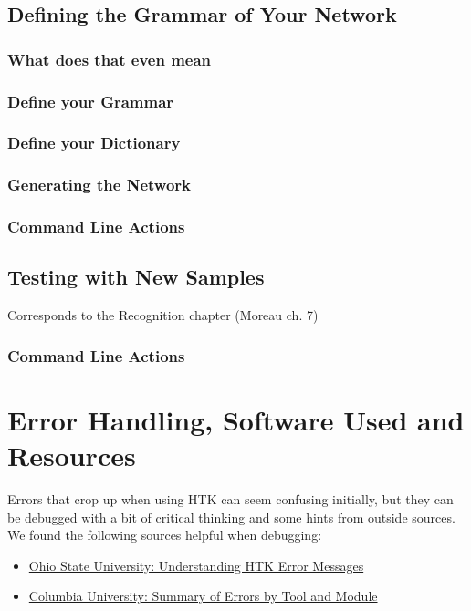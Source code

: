 \documentclass{wileySev}
\begin{document}
\chapter{Defining the Grammar of Your Network}
\section{What does that even mean}
\section{Define your Grammar}
\section{Define your Dictionary}
\section{Generating the Network}
\section{Command Line Actions}

\chapter{Testing with New Samples}
Corresponds to the Recognition chapter (Moreau ch. 7)
\section{Command Line Actions}

\part{Error Handling, Software Used and Resources}

Errors that crop up when using HTK can seem confusing initially, but they can be debugged with a bit of critical thinking and some hints from outside sources. We found the following sources helpful when debugging:
\begin{itemize}
\item \href{http://www.ling.ohio-state.edu/~bromberg/htk_problems.html}{Ohio State University: Understanding HTK Error Messages}
\item \href{http://www.ee.columbia.edu/~dpwe/LabROSA/doc/HTKBook21/node256.html}{Columbia University: Summary of Errors by Tool and Module}
\end{itemize}
\end{document}
